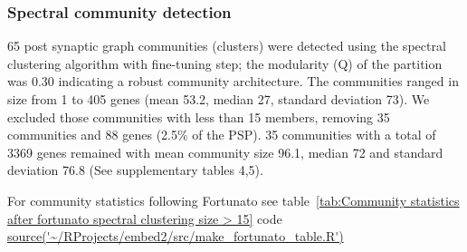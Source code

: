 \subsubsection{Spectral community detection}
65 post synaptic graph communities (clusters) were detected using the spectral clustering algorithm with fine-tuning step; the modularity (Q) of the partition was 0.30 indicating a robust community architecture.  The communities ranged in size from 1 to 405 genes (mean 53.2, median 27, standard deviation 73). We excluded those communities with less than 15 members, removing 35 communities and 88 genes (2.5\% of the PSP). 35 communities with a total of 3369 genes remained with mean community size 96.1, median 72 and standard deviation 76.8 (See supplementary tables 4,5).   

For community statistics following Fortunato \cite{fortunato2016community} see table~\ref{tab:Community statistics after fortunato spectral clustering size > 15} 
code \url{source('~/RProjects/embed2/src/make_fortunato_table.R')}




